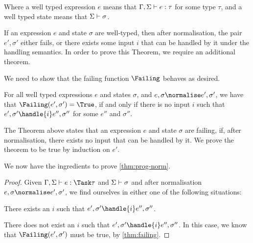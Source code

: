 Where a well typed expression $e$ means that $\Gamma,\Sigma\vdash e:\tau$ for
some type $\tau$, and a well typed state means that $\Sigma\vdash \sigma$.

If an expression $e$ and state $\sigma$ are well-typed, then after normalisation, the pair $e',\sigma'$
either fails, or there exists some input $i$ that can be handled by it under the handling semantics.
In order to prove this Theorem, we require an additional theorem.


We need to show that the failing function $\Failing$ behaves as desired.

\begin{theorem}
  For all well typed expressions $e$ and states $\sigma$,
  and $e,\sigma \normalise e',\sigma'$,
  we have that $\Failing(e',\sigma') = \True$,
  if and only if there is no input $i$
  such that $e',\sigma'\handle{i} e'',\sigma''$ for some $e''$ and $\sigma''$.
  \label{thm:failing}
\end{theorem}

The Theorem above states that an expression $e$ and state $\sigma$ are failing, if,
after normalisation, there exists no input that can be handled by it.
We prove the theorem to be true by induction on $e'$.


We now have the ingredients to prove \cref{thm:prog-norm}.

\begin{proof}
  Given $\Gamma,\Sigma\infers e:\Task\tau$ and $\Sigma\vdash \sigma$ and after
  normalisation $e,\sigma \normalise e',\sigma'$, we find ourselves in either one of the
  following situations:

  There exists an $i$ such that $e',\sigma'\handle{i} e'',\sigma''$.

  There does not exist an $i$ such that $e',\sigma'\handle{i} e'',\sigma''$. In this case, we
  know that $\Failing(e',\sigma')$ must be true, by \cref{thm:failing}.
\end{proof}




